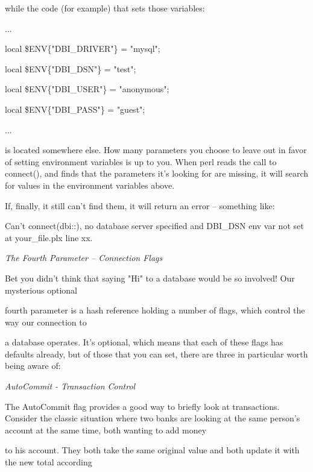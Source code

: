 \documentclass[a4paper,11pt]{book}
\begin{document}
\noindent while the code (for example) that sets those variables:

\noindent 

\noindent ...

\noindent local \$ENV\{"DBI\_DRIVER"\} = "mysql";

\noindent local \$ENV\{"DBI\_DSN"\} = "test";

\noindent local \$ENV\{"DBI\_USER"\} = "anonymous";

\noindent local \$ENV\{"DBI\_PASS"\} = "guest";

\noindent ...

\noindent 

\noindent is located somewhere else. How many parameters you choose to leave out in favor of setting environment variables is up to you. When perl reads the call to connect(), and finds that the parameters it's looking for are missing, it will search for values in the environment variables above.

\noindent If, finally, it still can't find them, it will return an error -- something like:

\noindent 

\noindent Can't connect(dbi::), no database server specified and DBI\_DSN env var not set at your\_file.plx line xx.

\noindent 

\noindent \textit{The Fourth Parameter -- Connection Flags}

\noindent Bet you didn't think that saying "Hi" to a database would be so involved! Our mysterious optional

\noindent fourth parameter is a hash reference holding a number of flags, which control the way our connection to

\noindent a database operates. It's optional, which means that each of these flags has defaults already, but of those that you can set, there are three in particular worth being aware of:

\noindent 

\noindent \textit{AutoCommit - Transaction Control}

\noindent The AutoCommit flag provides a good way to briefly look at transactions. Consider the classic situation where two banks are looking at the same person's account at the same time, both wanting to add money

\noindent to his account. They both take the same original value and both update it with the new total according
\end{document}
